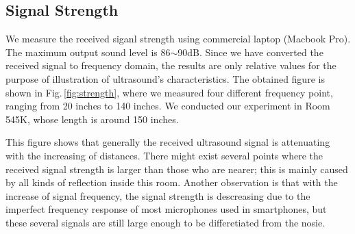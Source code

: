 

\subsection{Signal Strength}
\label{sec:signal-strength}
We measure the received siganl strength using commercial laptop (Macbook Pro). The maximum output sound level is 86$\sim$90dB. Since we have converted the received signal to frequency domain, the results are only relative values for the purpose of illustration of ultrasound's characteristics. The obtained figure is shown in Fig.\,\ref{fig:strength}, where we measured four different frequency point, ranging from 20 inches to 140 inches. We conducted our experiment in Room 545K, whose length is around 150 inches. 

This figure shows that generally the received ultrasound signal is attenuating with the increasing of distances. There might exist several points where the received signal strength is larger than those who are nearer; this is mainly caused by all kinds of reflection inside this room. Another observation is that with the increase of signal frequency, the signal strength is descreasing due to the imperfect frequency response of most microphones used in smartphones, but these several signals are still large enough to be differetiated from the nosie.

